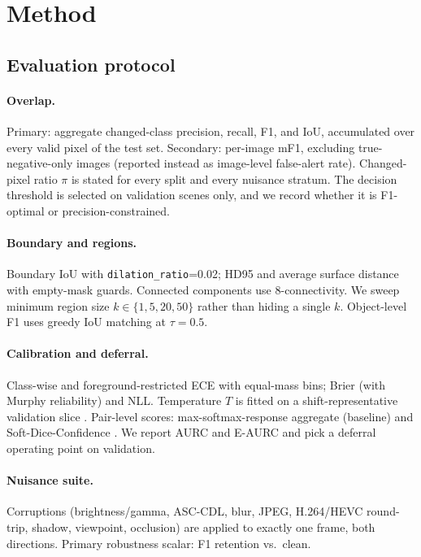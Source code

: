 \section{Method}
\label{sec:method}


\subsection{Evaluation protocol}
\label{sec:method-eval}

\paragraph{Overlap.}
Primary: aggregate changed-class precision, recall, F1, and IoU,
accumulated over every valid pixel of the test set. Secondary:
per-image mF1, excluding true-negative-only images (reported instead
as image-level false-alert rate). Changed-pixel ratio $\pi$ is stated
for every split and every nuisance stratum. The decision threshold is
selected on validation scenes only, and we record whether it is
F1-optimal or precision-constrained.

\paragraph{Boundary and regions.}
Boundary IoU \cite{cheng_2021_boundaryiou} with
\texttt{dilation\_ratio}=0.02; HD95 and average surface distance with
empty-mask guards. Connected components use 8-connectivity. We sweep
minimum region size $k\in\{1,5,20,50\}$ rather than hiding a single
$k$. Object-level F1 uses greedy IoU matching at $\tau=0.5$.

\paragraph{Calibration and deferral.}
Class-wise and foreground-restricted ECE with equal-mass bins; Brier
(with Murphy reliability) and NLL. Temperature $T$ is fitted on a
shift-representative validation slice \cite{ovadia_2019_shift}.
Pair-level scores: max-softmax-response aggregate (baseline) and
Soft-Dice-Confidence \cite{gauthier_2024_sdc}. We report AURC and
E-AURC and pick a deferral operating point on validation.

\paragraph{Nuisance suite.}
Corruptions (brightness/gamma, ASC-CDL, blur, JPEG, H.264/HEVC
round-trip, shadow, viewpoint, occlusion) are applied to exactly one
frame, both directions. Primary robustness scalar: F1 retention vs.\
clean.

